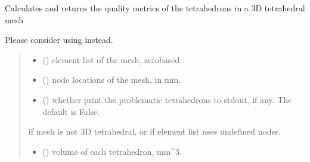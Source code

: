\documentclass[letterpaper,10pt,english]{sphinxmanual}
\begin{document}
\begin{fulllineitems}
\label{\detokenize{_autosummary/nirfasterff.meshing.meshutils.checkmesh3d_solid:nirfasterff.meshing.meshutils.checkmesh3d_solid}}
\pysigstartsignatures
{}
\pysigstopsignatures
\sphinxAtStartPar
Calculates and returns the quality metrics of the tetrahedrons in a 3D tetrahedral mesh

\sphinxAtStartPar
Please consider using  instead.
\begin{quote}\begin{description}
\begin{itemize}
\item {} 
\sphinxAtStartPar
{} () \textendash{} element list of the mesh, zero\sphinxhyphen{}based.

\item {} 
\sphinxAtStartPar
{} () \textendash{} node locations of the mesh, in mm.

\item {} 
\sphinxAtStartPar
{} (\sphinxstyleliteralemphasis{\sphinxupquote{, }}) \textendash{} whether print the problematic tetrahedrons to stdout, if any. The default is False.

\end{itemize}

\sphinxAtStartPar
{} \textendash{} if mesh is not 3D tetrahedral, or if element list uses undefined nodes.

\sphinxAtStartPar
\begin{itemize}
\item {} 
\sphinxAtStartPar
{} () \textendash{} volume of each tetrahedron, mm\textasciicircum{}3.


\end{itemize}
\end{description}
\end{quote}
\end{fulllineitems}
\end{document}
